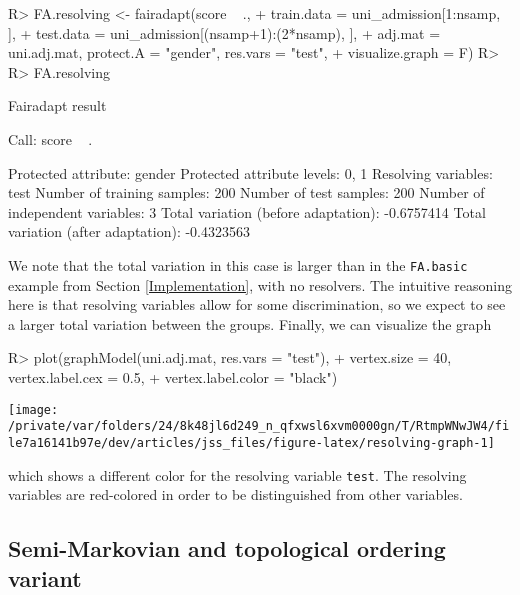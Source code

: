 \documentclass[
  notitle]{jss}
\begin{document}
\begin{CodeChunk}
\begin{CodeInput}
R> FA.resolving <- fairadapt(score ~ .,
+   train.data = uni_admission[1:nsamp, ],
+   test.data = uni_admission[(nsamp+1):(2*nsamp), ],
+   adj.mat = uni.adj.mat, protect.A = "gender", res.vars = "test",
+   visualize.graph = F)
R> 
R> FA.resolving
\end{CodeInput}
\begin{CodeOutput}
Fairadapt result

Call:
 score ~ . 

Protected attribute:                  gender 
Protected attribute levels:           0, 1 
Resolving variables:                  test 
Number of training samples:           200 
Number of test samples:               200 
Number of independent variables:      3 
Total variation (before adaptation):  -0.6757414 
Total variation (after adaptation):   -0.4323563 
\end{CodeOutput}
\end{CodeChunk}

We note that the total variation in this case is larger than in the
\texttt{FA.basic} example from Section \ref{Implementation}, with no
resolvers. The intuitive reasoning here is that resolving variables
allow for some discrimination, so we expect to see a larger total
variation between the groups. Finally, we can visualize the graph

\begin{CodeChunk}
\begin{CodeInput}
R> plot(graphModel(uni.adj.mat, res.vars = "test"),
+   vertex.size = 40, vertex.label.cex = 0.5,
+   vertex.label.color = "black")
\end{CodeInput}


\begin{center}\texttt{[image: /private/var/folders/24/8k48jl6d249\_n\_qfxwsl6xvm0000gn/T/RtmpWNwJW4/file7a16141b97e/dev/articles/jss\_files/figure-latex/resolving-graph-1]} \end{center}

\end{CodeChunk}

which shows a different color for the resolving variable \texttt{test}.
The resolving variables are red-colored in order to be distinguished
from other variables.

\hypertarget{semi-markovian-and-topological-ordering-variant}{%
\subsection{Semi-Markovian and topological ordering
variant}\label{semi-markovian-and-topological-ordering-variant}}
\end{document}
